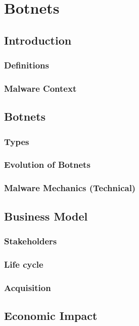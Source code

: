 \chapter{Botnets}

\section{Introduction}
	\subsection{Definitions}
	\subsection{Malware Context}
	
\section{Botnets}
	\subsection{Types}
	\subsection{Evolution of Botnets}
	\subsection{Malware Mechanics (Technical)}
		
	

\section{Business Model}
	\subsection{Stakeholders}
	\subsection{Life cycle}
	\subsection{Acquisition}
	
	
\section{Economic Impact}
